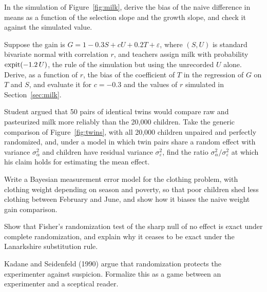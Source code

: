 \begin{exercises}
\item\label{ex:ch03:1} In the simulation of Figure~\ref{fig:milk}, derive the bias of the naive difference in means as a function of the selection slope and the growth slope, and check it against the simulated value.
\item\label{ex:ch03:2} Suppose the gain is $G = 1 - 0.3S + cU + 0.2T + \varepsilon$, where $(S, U)$ is standard bivariate normal with correlation $r$, and teachers assign milk with probability $\operatorname{expit}(-1.2\,U)$, the rule of the simulation but using the unrecorded $U$ alone. Derive, as a function of $r$, the bias of the coefficient of $T$ in the regression of $G$ on $T$ and $S$, and evaluate it for $c = -0.3$ and the values of $r$ simulated in Section~\ref{sec:milk}.
\item\label{ex:ch03:3} Student argued that 50 pairs of identical twins would compare raw and pasteurized milk more reliably than the 20,000 children. Take the generic comparison of Figure~\ref{fig:twins}, with all 20,000 children unpaired and perfectly randomized, and, under a model in which twin pairs share a random effect with variance $\sigma_\alpha^2$ and children have residual variance $\sigma_\varepsilon^2$, find the ratio $\sigma_\alpha^2/\sigma_\varepsilon^2$ at which his claim holds for estimating the mean effect.
\item\label{ex:ch03:4} Write a Bayesian measurement error model for the clothing problem, with clothing weight depending on season and poverty, so that poor children shed less clothing between February and June, and show how it biases the naive weight gain comparison.
\item\label{ex:ch03:5} Show that Fisher's randomization test of the sharp null of no effect is exact under complete randomization, and explain why it ceases to be exact under the Lanarkshire substitution rule.
\item\label{ex:ch03:6} Kadane and Seidenfeld (1990) argue that randomization protects the experimenter against suspicion. Formalize this as a game between an experimenter and a sceptical reader.
\end{exercises}
